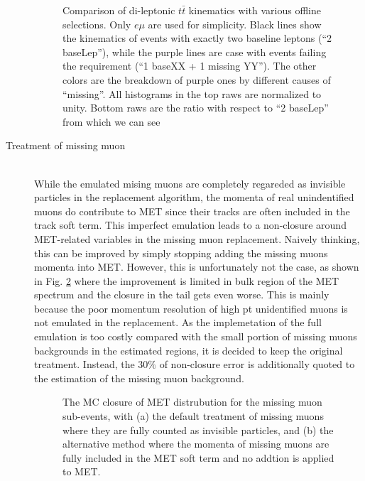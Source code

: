\begin{description}
\begin{figure}[h]
    \caption{Comparison of di-leptonic $t\bar{t}$ kinematics with various offline selections. Only $e\mu$ are used for simplicity. Black lines show the kinematics of events with exactly two baseline leptons (``2 baseLep''), while the purple lines are case with events failing the requirement (``1 baseXX + 1 missing YY''). The other colors are the breakdown of purple ones by different causes of ``missing''. All histograms in the top raws are normalized to unity. Bottom raws are the ratio with respect to ``2 baseLep'' from which we can see    \label{fig::BGestimation::objRep::mcClosure::biasFrom2Lreq} }
\end{figure}
\fi

\item [Treatment of missing muon]  \mbox{} \\
While the emulated mising muons are completely regareded as invisible particles in the replacement algorithm, the momenta of real unindentified muons do contribute to MET since their tracks are often included in the track soft term. This imperfect emulation leads to a non-closure around MET-related variables in the missing muon replacement. Naively thinking, this can be improved by simply stopping adding the missing muons momenta into MET. However, this is unfortunately not the case, as shown in Fig. \ref{fig::BGestimation::objRep::mcClosure::metSoftTerm_mu} where the improvement is limited in bulk region of the MET spectrum and the closure in the tail gets even worse. This is mainly because the poor momentum resolution of high pt unidentified muons is not emulated in the replacement. As the implemetation of the full emulation is too costly compared with the small portion of missing muons backgrounds in the estimated regions, it is decided to keep the original treatment. Instead, the $30\%$ of non-closure error is additionally quoted to the estimation of the missing muon background. \\

\begin{figure}[h]
  \centering
    \caption{The MC closure of MET distrubution for the missing muon sub-events, with (a) the default treatment of missing muons where they are fully counted as invisible particles, and (b) the alternative method where the momenta of missing muons are fully included in the MET soft term and no addtion is applied to MET.
      \label{fig::BGestimation::objRep::mcClosure::metSoftTerm_mu} }
\end{figure}



\end{description}
